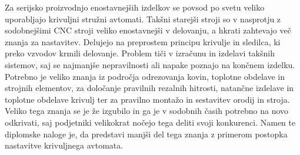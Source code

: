 Za serijsko proizvodnjo enostavnejših izdelkov se povsod po svetu veliko
uporabljajo krivuljni stružni avtomati. Takšni starejši stroji so
v nasprotju z sodobnejšimi CNC stroji veliko enostavnejši v delovanju,
a hkrati zahtevajo več znanja za nastavitev. Delujejo na preprostem
principu krivulje in sledilca, ki preko vzvodov krmili delovanje.
Problem tiči v izračunu in izdelavi takšnih sistemov, saj se najmanjše
nepravilnosti ali napake poznajo na končnem izdelku. Potrebno je
veliko znanja iz področja odrezovanja kovin, toplotne obdelave
in strojnih elementov, za določanje pravilnih rezalnih hitrosti,
natančne izdelave in toplotne obdelave krivulj ter za pravilno
montažo in sestavitev orodij in stroja. Veliko tega znanja se je
že izgubilo in ga je v sodobnih časih potrebno na novo odkrivati,
saj podjetniki velikokrat nočejo tega deliti svoji konkurenci.
Namen te diplomske naloge je, da predstavi manjši del tega znanja
z primerom postopka nastavitve krivuljnega avtomata.